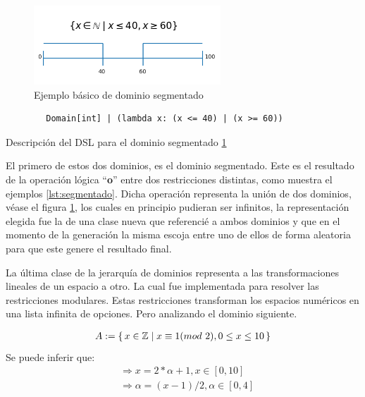 \begin{figure}[!ht]
    \centering
    \includegraphics[width=70mm]{Graphics/output.png}
    \caption{Ejemplo básico de dominio segmentado}
    \label{fig:segmentado}
\end{figure}
\newpage
\begin{listing}[!ht]
    \begin{verbatim}
        Domain[int] | (lambda x: (x <= 40) | (x >= 60))
    \end{verbatim}
    \caption{Descripción del DSL para el dominio segmentado \ref{fig:segmentado}}
    \label{lst:segmentado}
\end{listing}

El primero de estos dos dominios, es el dominio segmentado. Este es el resultado de la operación lógica ``{\bf o}'' entre dos
restricciones distintas, como muestra el ejemplos \ref{lst:segmentado}. 
Dicha operación representa la unión de dos dominios, véase el figura \ref{fig:segmentado}, los cuales 
en principio pudieran ser infinitos, la representación elegida fue la de una clase nueva que referencié a ambos dominios y 
que en el momento de la generación la misma escoja entre uno de ellos de forma aleatoria para que este genere el resultado final.

La última clase de la jerarquía de dominios representa a las transformaciones lineales de un espacio a otro. 
La cual fue implementada para resolver las restricciones modulares. Estas restricciones transforman los espacios 
numéricos en una lista infinita de opciones. Pero analizando el dominio siguiente. 

\begin{align*}\label{modular}
    A := \{\,x \in \mathbb{Z}\mid x \equiv 1 (mod\ 2), 0 \leq x \leq 10\,\} \\ 
\end{align*}
Se puede inferir que:
\begin{equation} \label{eq1}
    \begin{split}
    & \Rightarrow x = 2 * \alpha + 1, x \in [0, 10] \\
    & \Rightarrow \alpha = (x - 1)/2, \alpha \in [0, 4] \\ 
  \end{split}
\end{equation}


